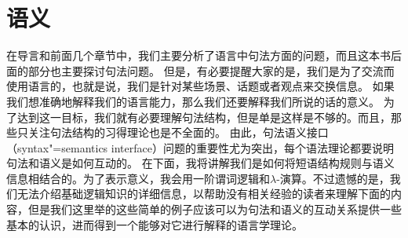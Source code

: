 \section{语义}
\label{sec-PSG-Semantik}

在导言和前面几个章节中，我们主要分析了语言中句法方面的问题，而且这本书后面的部分也主要探讨句法问题。
但是，有必要提醒大家的是，我们是为了交流而使用语言的，也就是说，我们是针对某些场景、话题或者观点来交换信息。
如果我们想准确地解释我们的语言能力，那么我们还要解释我们所说的话的意义。
为了达到这一目标，我们就有必要理解句法结构，但是单是这样是不够的。而且，那些只关注句法结构的习得理论也是不全面的。
由此，句法语义接口（syntax"=semantics interface）问题的重要性尤为突出，每个语法理论都要说明句法和语义是如何互动的。
在下面，我将讲解我们是如何将短语结构规则与语义信息相结合的。为了表示意义，我会用一阶谓词逻辑和$\lambda$-演算。不过遗憾的是，我们无法介绍基础逻辑知识的详细信息，以帮助没有相关经验的读者来理解下面的内容，但是我们这里举的这些简单的例子应该可以为句法和语义的互动关系提供一些基本的认识，进而得到一个能够对它进行解释的语言学理论。

